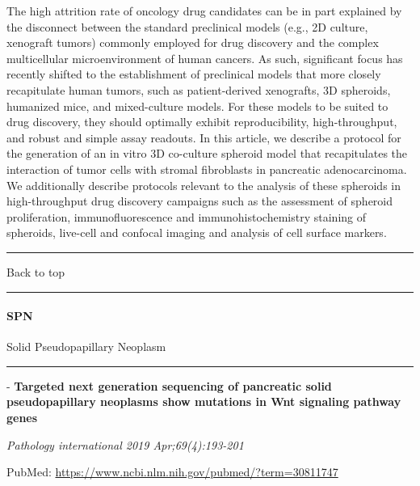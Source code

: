 \documentclass[]{article}
\let\oldparagraph\paragraph
\renewcommand{\paragraph}[1]{\oldparagraph{#1}\mbox{}}
\begin{document}
The high attrition rate of oncology drug candidates can be in part
explained by the disconnect between the standard preclinical models
(e.g., 2D culture, xenograft tumors) commonly employed for drug
discovery and the complex multicellular microenvironment of human
cancers. As such, significant focus has recently shifted to the
establishment of preclinical models that more closely recapitulate human
tumors, such as patient-derived xenografts, 3D spheroids, humanized
mice, and mixed-culture models. For these models to be suited to drug
discovery, they should optimally exhibit reproducibility,
high-throughput, and robust and simple assay readouts. In this article,
we describe a protocol for the generation of an in vitro 3D co-culture
spheroid model that recapitulates the interaction of tumor cells with
stromal fibroblasts in pancreatic adenocarcinoma. We additionally
describe protocols relevant to the analysis of these spheroids in
high-throughput drug discovery campaigns such as the assessment of
spheroid proliferation, immunofluorescence and immunohistochemistry
staining of spheroids, live-cell and confocal imaging and analysis of
cell surface markers.

{}

{}

\begin{center}\rule{0.5\linewidth}{\linethickness}\end{center}

Back to top

\begin{center}\rule{0.5\linewidth}{\linethickness}\end{center}

\pagebreak

\hypertarget{spn-1}{%
\paragraph{SPN}\label{spn-1}}

Solid Pseudopapillary Neoplasm

\begin{center}\rule{0.5\linewidth}{\linethickness}\end{center}

 - \textbf{Targeted next generation sequencing of pancreatic solid
pseudopapillary neoplasms show mutations in Wnt signaling pathway genes}

\emph{Pathology international 2019 Apr;69(4):193-201}

PubMed: \url{https://www.ncbi.nlm.nih.gov/pubmed/?term=30811747}
\end{document}
